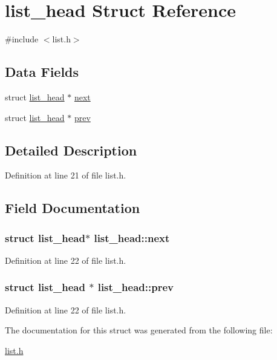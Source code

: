 \hypertarget{structlist__head}{\section{list\-\_\-head Struct Reference}
\label{structlist__head}
}


{\ttfamily \#include $<$list.\-h$>$}

\subsection*{Data Fields}
\begin{DoxyCompactItemize}
\item 
struct \hyperlink{structlist__head}{list\-\_\-head} $\ast$ \hyperlink{structlist__head_ac3b0ff0dfb978a0cfbdad6b9d19cdcfe}{next}
\item 
struct \hyperlink{structlist__head}{list\-\_\-head} $\ast$ \hyperlink{structlist__head_aaa0eabda8877e1d6de73a33f223ad004}{prev}
\end{DoxyCompactItemize}


\subsection{Detailed Description}


Definition at line 21 of file list.\-h.



\subsection{Field Documentation}
\hypertarget{structlist__head_ac3b0ff0dfb978a0cfbdad6b9d19cdcfe}{
\subsubsection[{next}]{\setlength{\rightskip}{0pt plus 5cm}struct {\bf list\-\_\-head}$\ast$ list\-\_\-head\-::next}}\label{structlist__head_ac3b0ff0dfb978a0cfbdad6b9d19cdcfe}


Definition at line 22 of file list.\-h.

\hypertarget{structlist__head_aaa0eabda8877e1d6de73a33f223ad004}{
\subsubsection[{prev}]{\setlength{\rightskip}{0pt plus 5cm}struct {\bf list\-\_\-head} $\ast$ list\-\_\-head\-::prev}}\label{structlist__head_aaa0eabda8877e1d6de73a33f223ad004}


Definition at line 22 of file list.\-h.



The documentation for this struct was generated from the following file\-:\begin{DoxyCompactItemize}
\item 
\hyperlink{list_8h}{list.\-h}\end{DoxyCompactItemize}
